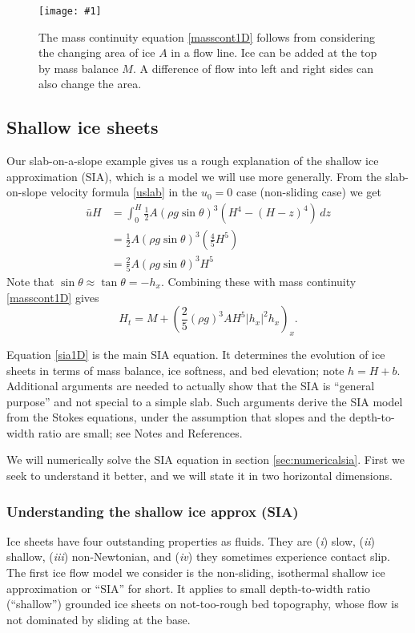 \documentclass[titlepage,letterpaper,final,12pt]{scrartcl}
\newcommand{\onefigsize}[3]{
\begin{figure}[ht]
\centering
\texttt{[image: \#1]}
\caption{#2}
\label{fig:#1}
\end{figure}}
\begin{document}
\onefigsize{slabmasscontfig}{The mass continuity equation \eqref{masscont1D} follows from considering the changing area of ice $A$ in a flow line.  Ice can be added at the top by mass balance $M$.  A difference of flow into left and right sides can also change the area.}{2.5in}


\subsection{Shallow ice sheets}  Our slab-on-a-slope example gives us a rough explanation of the shallow ice approximation (SIA), which is a model we will use more generally.  From the slab-on-slope velocity formula \eqref{uslab} in the $u_0=0$ case (non-sliding case) we get
\begin{align*}
\bar u H &= \int_0^H \frac{1}{2} A (\rho g \sin\theta)^3  \left(H^4 - (H-z)^4\right)\,dz \\
	&= \frac{1}{2} A (\rho g \sin\theta)^3  \left(\frac{4}{5} H^5\right) \\
	&= \frac{2}{5} A (\rho g \sin\theta)^3 H^5
\end{align*}
Note that $\sin \theta \approx \tan\theta = - h_x$.  Combining these with mass continuity \eqref{masscont1D} gives
\begin{equation}
  H_t = M + \left(\frac{2}{5} (\rho g)^3 A H^5 |h_x|^2 h_x\right)_x. \label{sia1D}
\end{equation}

Equation \eqref{sia1D} is the main SIA equation.  It determines the evolution of ice sheets in terms of mass balance, ice softness, and bed elevation; note $h=H+b$.  Additional arguments are needed to actually show that the SIA is ``general purpose'' and not special to a simple slab.  Such arguments derive the SIA model from the Stokes equations, under the assumption that slopes and the depth-to-width ratio are small; see Notes and References.

We will numerically solve the SIA equation in section \ref{sec:numericalsia}.  First we seek to understand it better, and we will state it in two horizontal dimensions.

\subsubsection*{Understanding the shallow ice approx (SIA)}  Ice sheets have four outstanding properties as fluids.  They are (\emph{i}) slow, (\emph{ii}) shallow,  (\emph{iii}) non-Newtonian, and (\emph{iv}) they sometimes experience contact slip.  The first ice flow model we consider is the non-sliding, isothermal shallow ice approximation or ``SIA'' for short.  It applies to small depth-to-width ratio (``shallow'') grounded ice sheets on not-too-rough bed topography, whose flow is not dominated by sliding at the base.
\end{document}
